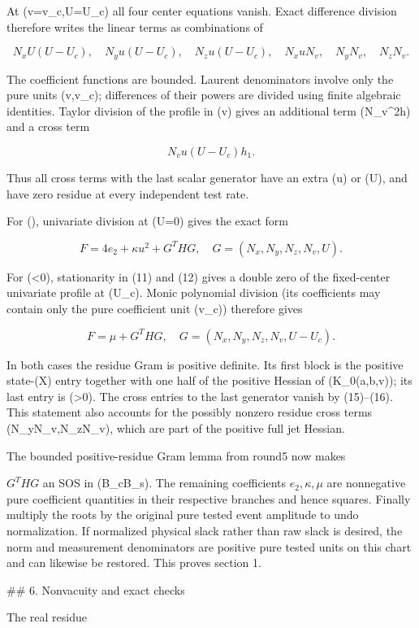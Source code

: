 At (v=v_c,U=U_c) all four center equations vanish. Exact difference
division therefore writes the linear terms as combinations of

\[
N_x U(U-U_c),\quad N_yu(U-U_c),\quad N_zu(U-U_c),
\quad N_xuN_v,\quad N_yN_v,\quad N_zN_v.
\tag{15}
\]

The coefficient functions are bounded. Laurent denominators involve only
the pure units (v,v_c); differences of their powers are divided using
finite algebraic identities. Taylor division of the profile in (v)
gives an additional term (N_v^2h) and a cross term

\[
N_vu(U-U_c)h_1.
\tag{16}
\]

Thus all cross terms with the last scalar generator have an extra (u)
or (U), and have zero residue at every independent test rate.

For (\kappa{}), univariate division at (U=0) gives the exact form

\[
F=4e_2+\kappa u^2+G^T H G,
\quad G=(N_x,N_y,N_z,N_v,U).
\tag{17}
\]

For (\kappa<0), stationarity in (11) and (12) gives a double zero of
the fixed-center univariate profile at (U_c). Monic polynomial division
(its coefficients may contain only the pure coefficient unit (v_c))
therefore gives

\[
F=\mu+G^THG,
\quad G=(N_x,N_y,N_z,N_v,U-U_c).
\tag{18}
\]

In both cases the residue Gram is positive definite. Its first block is
the positive state-(X) entry together with one half of the positive
Hessian of (K_0(a,b,v)); its last entry is (\gamma>0). The cross entries
to the last generator vanish by (15)–(16). This statement also accounts
for the possibly nonzero residue cross terms (N_yN_v,N_zN_v), which are
part of the positive full jet Hessian.

The bounded positive-residue Gram lemma from round5 now makes

\(G^THG\) an SOS in (B_c\otimes B_s). The remaining coefficients
\(e_2,\kappa,\mu\) are nonnegative pure coefficient quantities in their
respective branches and hence squares. Finally multiply the roots by the
original pure tested event amplitude to undo normalization. If normalized
physical slack rather than raw slack is desired, the norm and measurement
denominators are positive pure tested units on this chart and can likewise
be restored. This proves section 1.

## 6. Nonvacuity and exact checks

The real residue

